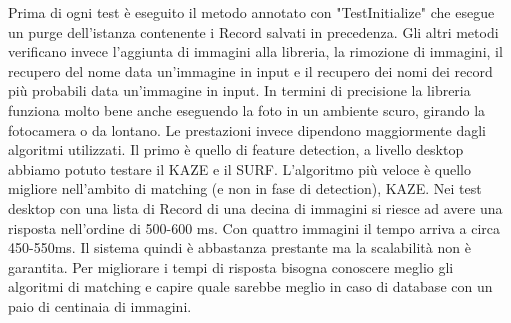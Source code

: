 \documentclass[twoside]{supsistudent}
\newcommand{\Decaa}{\newline\vspace{0.5mm}\newline\noindent}
\begin{document}
Prima di ogni test è eseguito il metodo annotato con "TestInitialize" che esegue un purge dell'istanza contenente i Record salvati in precedenza. Gli altri metodi verificano invece l'aggiunta di immagini alla libreria, la rimozione di immagini, il recupero del nome data un'immagine in input e il recupero dei nomi dei record più probabili data un'immagine in input.
\Decaa
In termini di precisione la libreria funziona molto bene anche eseguendo la foto in un ambiente scuro, girando la fotocamera o da lontano. Le prestazioni invece dipendono maggiormente dagli algoritmi utilizzati. Il primo è quello di feature detection, a livello desktop abbiamo potuto testare il KAZE e il SURF. 
L'algoritmo più veloce è quello migliore nell'ambito di matching (e non in fase di detection), KAZE. Nei test desktop con una lista di Record di una decina di immagini si riesce ad avere una risposta nell'ordine di 500-600 ms. Con quattro immagini il tempo arriva a circa 450-550ms. Il sistema quindi è abbastanza prestante ma la scalabilità non è garantita. Per migliorare i tempi di risposta bisogna conoscere meglio gli algoritmi di matching e capire quale sarebbe meglio in caso di database con un paio di centinaia di immagini.
\end{document}
